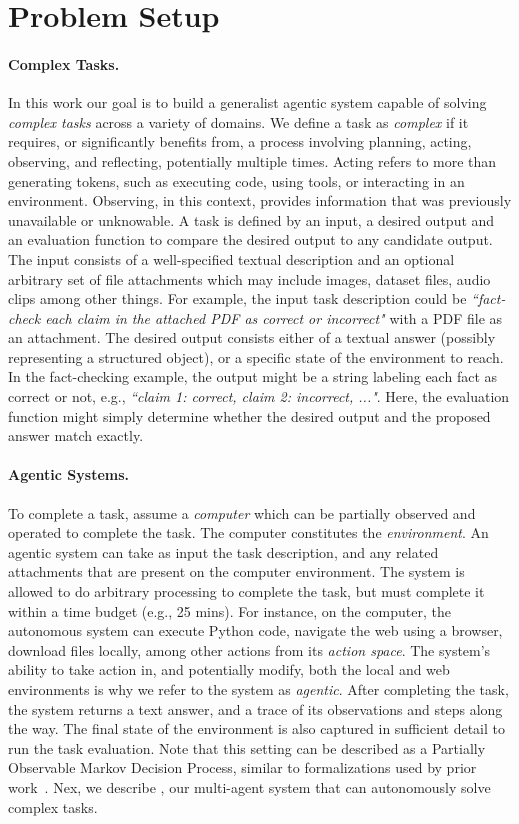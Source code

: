 \section{Problem Setup}

\paragraph{Complex Tasks.} In this work our goal is to build a generalist agentic system capable of solving \emph{complex tasks} across a variety of domains. We define a task as {\em complex} if it requires, or significantly benefits from, a process involving planning, acting, observing, and reflecting, potentially multiple times. Acting refers to more than generating tokens, such as executing code, using tools, or interacting in an environment. Observing, in this context, provides information that was previously unavailable or unknowable. A task is defined by an input, a desired output and an evaluation function to compare the desired output to any candidate output. The input consists of a well-specified textual description and an optional arbitrary set of file attachments which may include images, dataset files, audio clips among other things. For example, the input task description could be \textit{``fact-check each claim in the attached PDF as correct or incorrect"} with a PDF file as an attachment. The desired output consists either of a textual answer (possibly representing a structured object), or a specific state of the environment to reach. In the fact-checking example, the output might be a string labeling each fact as correct or not, e.g., \textit{``claim 1: correct, claim 2: incorrect, ..."}.
Here, the evaluation function might simply determine whether the desired output and the proposed answer match exactly.


\paragraph{Agentic Systems.} 
To complete a task, assume a {\em computer} which can be partially observed and operated to complete the task. The computer constitutes the \emph{environment}.
An agentic system can take as input the task description, and any related attachments that are present on the computer environment. The system is allowed to do arbitrary processing to complete the task, but must complete it within a time budget (e.g., 25 mins).
For instance, on the computer, the autonomous system can execute Python code, navigate the web using a browser, download files locally, among other actions from its \emph{action space}. The system's ability to take action in, and potentially modify, both the local and web environments is why we refer to the system as \emph{agentic}. After completing the task, the system returns a text answer, and a trace of its observations and steps along the way. The final state of the environment is also captured in sufficient detail to run the task evaluation. 
Note that this setting can be described as a Partially Observable Markov Decision Process, similar to formalizations used by prior work~\cite{sodhi2024stepstackedllmpolicies}.
Nex, we describe \team, our multi-agent system that can autonomously solve complex tasks. 
